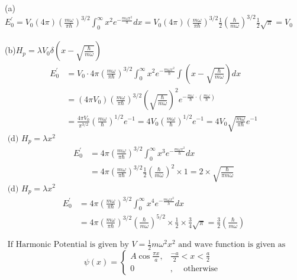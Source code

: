 \begin{enumerate}
\begin{answer}
(a)	$E_{0}^{\prime}=V_{0}(4 \pi)\left(\frac{m \omega}{\pi \hbar}\right)^{3 / 2 } \int_{0}^{\infty} x^2e^{-\frac{m \omega x^{2}}{\hbar}} d x=V_{0}(4 \pi)\left(\frac{m \omega}{\pi \hbar}\right)^{3 / 2} \frac{1}{2}\left(\frac{\hbar}{m \omega}\right)^{3 / 2} \frac{1}{2} \sqrt{\pi}=V_{0}$\\\\
(b)$H_{p}=\lambda V_{0} \delta\left(x-\sqrt{\frac{\hbar}{m \omega}}\right)$
\begin{align*}
E_{0}^{\prime}&=V_{0} \cdot 4 \pi\left(\frac{m \omega}{\pi \hbar}\right)^{3 / 2} \int_{0}^{\infty} x^{2} e^{-\frac{m \omega x^{2}}{\hbar}} \int\left(x-\sqrt{\frac{\hbar}{m \omega}}\right) d x\\
&=\left(4 \pi V_{0}\right)\left(\frac{m \omega}{\pi \hbar}\right)^{3 / 2}\left(\sqrt{\frac{\hbar}{m \omega}}\right)^{2} e^{-\frac{m \omega}{\hbar} \cdot\left(\frac{m \omega}{\hbar}\right)}\\
&=\frac{4 \pi V_{0}}{\pi^{3 / 2}}\left(\frac{m \omega}{\hbar}\right)^{1 / 2} e^{-1}=4 V_{0}\left(\frac{m \omega}{\hbar}\right)^{1 / 2} e^{-1}=4 V_{0} \sqrt{\frac{m \omega}{\pi \hbar}} e^{-1}
\end{align*}
$\text { (d) } H_{p}=\lambda x^{2}$
\begin{align*}
E_{0}^{\prime}&=4 \pi\left(\frac{m \omega}{\pi \hbar}\right)^{3 / 2} \int_{0}^{\infty} x^{3} e^{-\frac{m \omega x^{2}}{\hbar}} d x\\
&=4 \pi\left(\frac{m \omega}{\pi \hbar}\right)^{3 / 2} \frac{1}{2}\left(\frac{\hbar}{m \omega}\right)^{2} \times 1=2 \times \sqrt{\frac{\hbar}{\pi m \omega}}
\end{align*}
$\text { (d) } H_{p}=\lambda x^{2}$\\
\begin{align*}
E_{0}^{\prime}&=4 \pi\left(\frac{m \omega}{\pi \hbar}\right)^{3 / 2} \int_{0}^{\infty} x^{4} e^{-\frac{m \omega x^{2}}{h}} d x\\
&=4 \pi\left(\frac{m \omega}{\pi \hbar}\right)^{3 / 2}\left(\frac{\hbar}{m \omega}\right)^{5 / 2} \times \frac{1}{2} \times \frac{3}{4} \sqrt{\pi}=\frac{3}{2}\left(\frac{\hbar}{m \omega}\right)
\end{align*}
\end{answer}
	\begin{minipage}{\textwidth}
	\item $\text { If Harmonic Potential is given by } V=\frac{1}{2} m \omega^{2} x^{2} \text { and wave function is given as }$\\
	$$
	\psi(x)= \begin{cases}A \cos \frac{\pi x}{a}, & \frac{-a}{2}<x<\frac{a}{2} \\ 0 & , \quad \text { otherwise }\end{cases}
$$
\end{minipage}
\end{enumerate}
